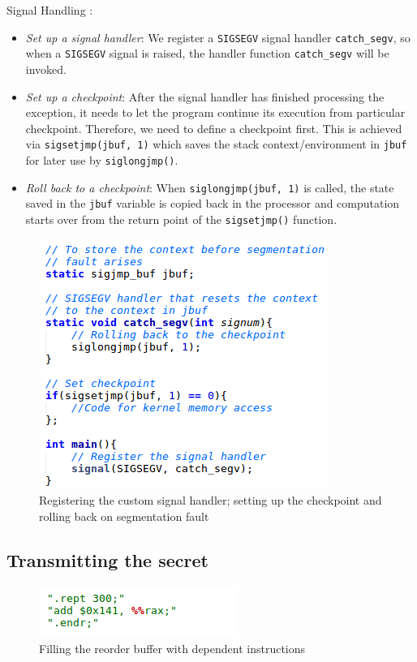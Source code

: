 \documentclass[runningheads]{llncs}
\begin{document}
Signal Handling :
\begin{itemize}%
\item \textit{Set up a signal handler}: We register a \texttt{SIGSEGV} signal handler \texttt{catch\_segv}, so when a \texttt{SIGSEGV} signal is raised, the handler function \texttt{catch\_segv} will be invoked.
\item \textit{Set up a checkpoint}: After the signal handler has finished processing the exception, it needs to let the program continue its execution from particular checkpoint. Therefore, we need to define a checkpoint first. This is achieved via \texttt{sigsetjmp(jbuf, 1)} which saves the stack context/environment in \texttt{jbuf} for later use by \texttt{siglongjmp()}.
\item \textit{Roll back to a checkpoint}: When \texttt{siglongjmp(jbuf, 1)} is called, the state saved in the \texttt{jbuf} variable is copied back in the processor and computation starts over from the return point of the \texttt{sigsetjmp()} function.
\end{itemize}

\begin{figure}[H]
\centerline{\includegraphics[scale=0.6]{images/allSig.png}}
\caption{Registering the custom signal handler; setting up the checkpoint and rolling back on segmentation fault} \label{seghandler}
\end{figure}

\subsection{Transmitting the secret}

\begin{figure}
\centerline{\includegraphics[scale=0.75]{images/rept.png}}
\caption{Filling the reorder buffer with dependent instructions} \label{rept}
\end{figure}
\end{document}
